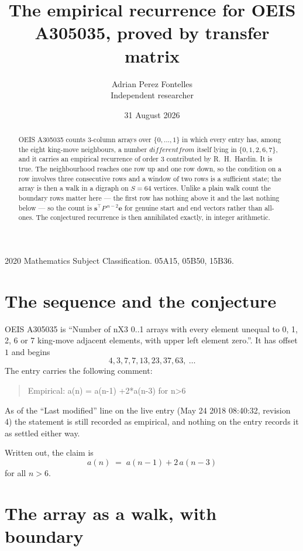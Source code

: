 \documentclass[11pt,a4paper]{article}
\title{The empirical recurrence for OEIS A305035, proved by transfer matrix}
\author{Adrian Perez Fontelles\\ \small Independent researcher}
\date{31 August 2026}
\theoremstyle{plain}
\theoremstyle{definition}
\begin{document}
\maketitle

\begin{abstract}
OEIS A305035 counts $3$-column arrays over $\{0,\dots,1\}$ in which every entry has,
among the eight king-move neighbours, a number $different from$ itself lying in $\{0,1,2,6,7\}$, and it carries an empirical
recurrence of order $3$ contributed by R.~H.~Hardin. It is true. The neighbourhood
reaches one row up and one row down, so the condition on a row involves three consecutive
rows and a window of two rows is a sufficient state; the array is then a walk in a digraph
on $S=64$ vertices. Unlike a plain walk count the boundary rows matter here --- the first
row has nothing above it and the last nothing below --- so the count is
$\mathbf{s}^{\!\top}P^{\,n-2}\mathbf{e}$ for genuine start and end vectors rather than
all-ones. The conjectured recurrence is then annihilated exactly, in integer arithmetic.
\end{abstract}

\noindent\small 2020 Mathematics Subject Classification. 05A15, 05B50, 15B36.\normalsize

\section{The sequence and the conjecture}

OEIS A305035 is ``Number of nX3 0..1 arrays with every element unequal to 0, 1, 2, 6 or 7 king-move adjacent elements, with upper left element zero.''. It has offset
$1$ and begins
\[
4, 3, 7, 7, 13, 23, 37, 63,\ \dots
\]
The entry carries the following comment:
\begin{quote}\small
Empirical: a(n) = a(n-1) +2*a(n-3) for n>6
\end{quote}
As of the ``Last modified'' line on the live entry (May 24 2018 08:40:32, revision
4) the statement is still recorded as empirical, and nothing on the entry
records it as settled either way.

Written out, the claim is
\begin{equation}\label{eq:conj}
a(n)\;=\;a(n-1) + 2\,a(n-3)
\end{equation}
for all $n>6$.

\section{The array as a walk, with boundary}
\end{document}
